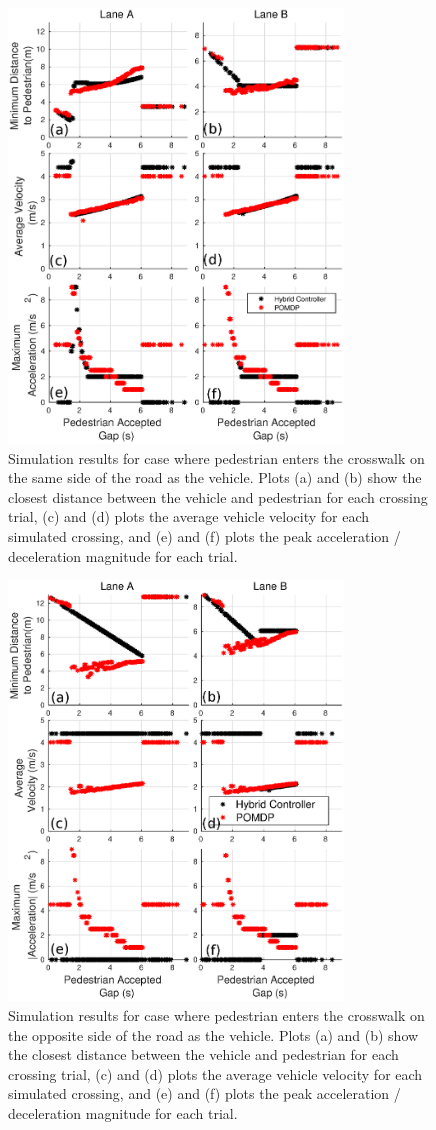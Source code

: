 \documentclass[letterpaper, 10 pt, conference]{ieeeconf} %
\begin{document}
\begin{figure}
\centering
\includegraphics[width=3.5in]{velPlotBoth.eps}
\caption{Simulation results for case where pedestrian enters the crosswalk on the same side of the road as the vehicle. Plots (a) and (b) show the closest distance between the vehicle and pedestrian for each crossing trial, (c) and (d) plots the average vehicle velocity for each simulated crossing, and (e) and (f) plots the peak acceleration / deceleration magnitude for each trial.}
\label{fig:velPlot1}
\end{figure}

\begin{figure}
\centering
\includegraphics[width=3.5in]{velPlot2Both.eps}
\caption{Simulation results for case where pedestrian enters the crosswalk on the opposite side of the road as the vehicle. Plots (a) and (b) show the closest distance between the vehicle and pedestrian for each crossing trial, (c) and (d) plots the average vehicle velocity for each simulated crossing, and (e) and (f) plots the peak acceleration / deceleration magnitude for each trial.}
\label{fig:velPlot2}
\end{figure}
\end{document}
